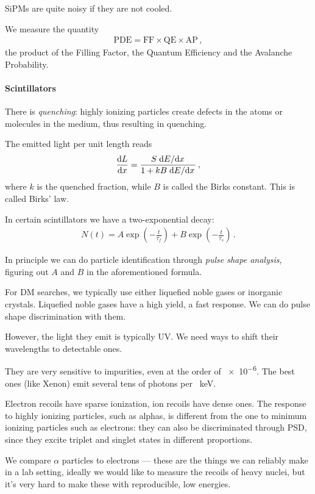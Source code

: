 \documentclass[main.tex]{subfiles}
\begin{document}
SiPMs are quite noisy if they are not cooled. 

We measure the quantity 
%
\begin{align}
\text{PDE} = \text{FF} \times \text{QE} \times \text{AP}
\,,
\end{align}
%
the product of the Filling Factor, the Quantum Efficiency and the Avalanche Probability. 

\paragraph{Scintillators}

There is \emph{quenching}: highly ionizing particles create defects in the 
atoms or molecules in the medium, thus resulting in quenching. 

The emitted light per unit length reads 
%
\begin{align}
\dv{L}{x} = \frac{S \dv*{E}{x}}{1 + k B \dv*{E}{x}}
\,,
\end{align}
%
where \(k\) is the quenched fraction, while \(B\) is called the Birks constant. 
This is called Birks' law. 

In certain scintillators we have a two-exponential decay: 
%
\begin{align}
N(t) = A \exp( - \frac{t}{\tau _f}) + B \exp(- \frac{t}{\tau _s})
\,.
\end{align}

In principle we can do particle identification through \emph{pulse shape analysis},
figuring out \(A\) and \(B\) in the aforementioned formula. 

For DM searches, we typically use either liquefied noble gases or inorganic crystals. 
Liquefied noble gases have a high yield, a fast response. 
We can do pulse shape discrimination with them. 

However, the light they emit is typically UV. We need ways to shift their wavelengths
to detectable ones. 

They are very sensitive to impurities, even at the order of \num{e-6}. 
The best ones (like Xenon) emit several tens of photons per \SI{}{keV}. 

Electron recoils have sparse ionization, ion recoils have dense ones. 
The response to highly ionizing particles, such as alphas, is different
from the one to minimum ionizing particles such as electrons: 
they can also be discriminated through PSD, since they excite triplet and singlet
states in different proportions. 

We compare \(\alpha \) particles to electrons --- these are the things we can reliably
make in a lab setting, ideally we would like to measure the recoils of heavy nuclei,
but it's very hard to make these with reproducible, low energies. 
\end{document}
